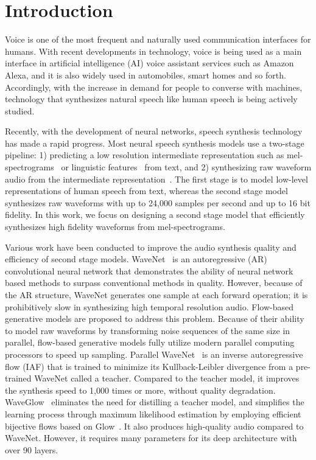 \section{Introduction}
Voice is one of the most frequent and naturally used communication interfaces for humans. With recent developments in technology, voice is being used as a main interface in artificial intelligence (AI) voice assistant services such as Amazon Alexa, and it is also widely used in automobiles, smart homes and so forth. Accordingly, with the increase in demand for people to converse with machines, technology that synthesizes natural speech like human speech is being actively studied.

Recently, with the development of neural networks, speech synthesis technology has made a rapid progress. Most neural speech synthesis models use a two-stage pipeline: 1) predicting a low resolution intermediate representation such as mel-spectrograms~\citep{shen2018natural, ping2017deep, li2019neural} or linguistic features~\citep{oord2016wavenet} from text, and 2) synthesizing raw waveform audio from the intermediate representation~\citep{oord2016wavenet, oord2018parallel, prenger2019waveglow, Kumar2018melgan}. The first stage is to model low-level representations of human speech from text, whereas the second stage model synthesizes raw waveforms with up to 24,000 samples per second and up to 16 bit fidelity. In this work, we focus on designing a second stage model that efficiently synthesizes high fidelity waveforms from mel-spectrograms.

Various work have been conducted to improve the audio synthesis quality and efficiency of second stage models. WaveNet~\citep{oord2016wavenet} is an autoregressive (AR) convolutional neural network that demonstrates the ability of neural network based methods to surpass conventional methods in quality. However, because of the AR structure, WaveNet generates one sample at each forward operation; it is prohibitively slow in synthesizing high temporal resolution audio. Flow-based generative models are proposed to address this problem. Because of their ability to model raw waveforms by transforming noise sequences of the same size in parallel, flow-based generative models fully utilize modern parallel computing processors to speed up sampling. Parallel WaveNet~\citep{oord2018parallel} is an inverse autoregressive flow (IAF) that is trained to minimize its Kullback-Leibler divergence from a pre-trained WaveNet called a teacher. Compared to the teacher model, it improves the synthesis speed to 1,000 times or more, without quality degradation. WaveGlow~\citep{prenger2019waveglow} eliminates the need for distilling a teacher model, and simplifies the learning process through maximum likelihood estimation by employing efficient bijective flows based on Glow~\citep{kingma2018glow}. It also produces high-quality audio compared to WaveNet. However, it requires many parameters for its deep architecture with over 90 layers.

